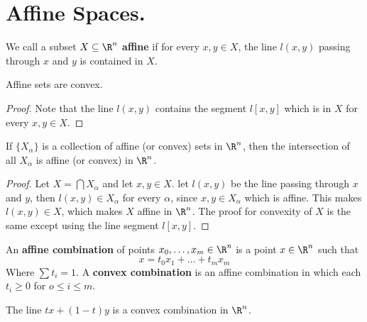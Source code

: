 
\section{Affine Spaces.}

\begin{definition}
    We call a subset $X \subseteq \R^n$  \textbf{affine} if for every $x,y \in
    X$, the line  $l(x,y)$ passing through $x$ and $y$ is contained in $X$.
\end{definition}

\begin{lemma}\label{3.1.1}
    Affine sets are convex.
\end{lemma}
\begin{proof}
    Note that the line $l(x,y)$ contains the segment $l[x,y]$ which is in $X$
    for every $x,y \in X$.
\end{proof}

\begin{theorem}\label{3.1.2}
    If $\{X_\alpha\}$ is a collection of affine (or convex) sets in $\R^n$,
    then the intersection of all $X_\alpha$ is affine (or convex) in $\R^n$.
\end{theorem}
\begin{proof}
    Let $X=\bigcap{X_\alpha}$ and let $x,y \in X$. let  $l(x,y)$ be the line
    passing through $x$ and $y$, then $l(x,y) \in X_\alpha$ for every $\alpha$,
    since  $x,y \in X_\alpha$  which is affine. This makes  $l(x,y) \in X$,
    which makes $X$ affine in  $\R^n$. The proof for convexity of  $X$ is the
    same except using the line segment  $l[x,y]$.
\end{proof}

\begin{definition}
    An \textbf{affine combination} of points $x_0, \dots,x_m \in \R^n$ is a
    point $x \in \R^n$ such that
    \begin{equation*}
        x=t_0x_1+\dots+t_mx_m
    \end{equation*}
    Where $\sum{t_i}=1$. A \textbf{convex combination} is an affine combination
    in which each $t_i \geq 0$ for $o \leq i \leq m$.
\end{definition}

\begin{example}\label{}
    The line $tx+(1-t)y$ is a convex combination in $\R^n$.
\end{example}

